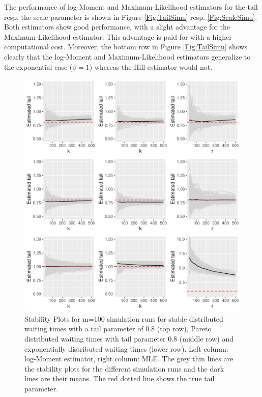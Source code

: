 \documentclass[]{elsarticle} %
\begin{document}
The performance of log-Moment and Maximum-Likelihood estimators for the
tail resp. the scale parameter is shown in Figure \ref{Fig:TailSimu}
resp. \ref{Fig:ScaleSimu}. Both estimators show good performance, with a
slight advantage for the Maximum-Likelihood estimator. This advantage is
paid for with a higher computational cost. Moreover, the bottom row in
Figure \ref{Fig:TailSimu} shows clearly that the log-Moment and
Maximum-Likelihood estimators generalize to the exponential case
(\(\beta = 1\)) whereas the Hill-estimator would not.

\begin{figure}

{\centering \includegraphics[width=1\linewidth]{article_springer_files/figure-latex/TailSimuplots-1} 

}

\caption{\label{Fig:TailSimu} Stability Plots for m=100 simulation runs for stable distributed waiting times with a tail parameter of 0.8 (top row), Pareto distributed waiting times with tail parameter 0.8 (middle row) and exponentially distributed waiting times (lower row). Left column: log-Moment estimator, right column: MLE. The grey thin lines are the stability plots for the different simulation runs and the dark lines are their means. The red dotted line shows the true tail parameter.}\label{fig:TailSimuplots}
\end{figure}
\end{document}

